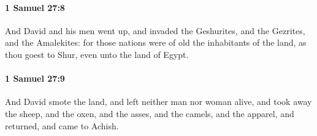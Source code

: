		\paragraph{1 Samuel 27:8} %
			\label{1SAMUEL-27-8}

			And David and his men went up, and invaded the Geshurites, and the Gezrites, and the Amalekites: for those nations were of old the inhabitants of the land, as thou goest to Shur, even unto the land of Egypt.


		\paragraph{1 Samuel 27:9} %
			\label{1SAMUEL-27-9}

			And David smote the land, and left neither man nor woman alive, and took away the sheep, and the oxen, and the asses, and the camels, and the apparel, and returned, and came to Achish.

